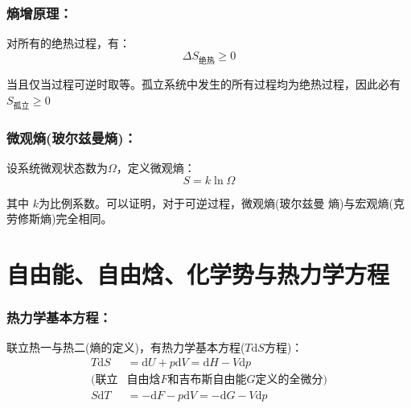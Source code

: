 \documentclass[zihao=-4,UTF8]{report}
\begin{document}
\subsubsection{熵增原理：}
对所有的绝热过程，有：
\begin{equation}
    \Delta S_{\text{绝热}} \ge  0
\end{equation}
{\par\color{gray}\small
当且仅当过程可逆时取等。孤立系统中发生的所有过程均为绝热过程，因此必有$S_{\text{孤立}} \ge 0$
\par}

\subsubsection{微观熵(玻尔兹曼熵)：}
设系统微观状态数为$\Omega$，定义微观熵：
\begin{equation}
    S = k\ln \Omega
\end{equation}
{\par\color{gray}\small
其中 $k$为比例系数。可以证明，对于可逆过程，微观熵(玻尔兹曼 熵)与宏观熵(克劳修斯熵)完全相同。
\par}

\section{自由能、自由焓、化学势与热力学方程}

\subsubsection{热力学基本方程：}
联立热一与热二(熵的定义)，有热力学基本方程($T\mathrm{d}S$方程)：
\begin{align*}
    T\mathrm{d}S &= \mathrm{d}U +p\mathrm{d}V  
    = \mathrm{d}H - V\mathrm{d}p \\
    (\text{联立}&\text{自由焓$F$和吉布斯自由能$G$定义的全微分})\\
    S\mathrm{d}T& = -\mathrm{d}F - p\mathrm{d}V = -\mathrm{d}G - V\mathrm{d}p 
\end{align*}
\end{document}
